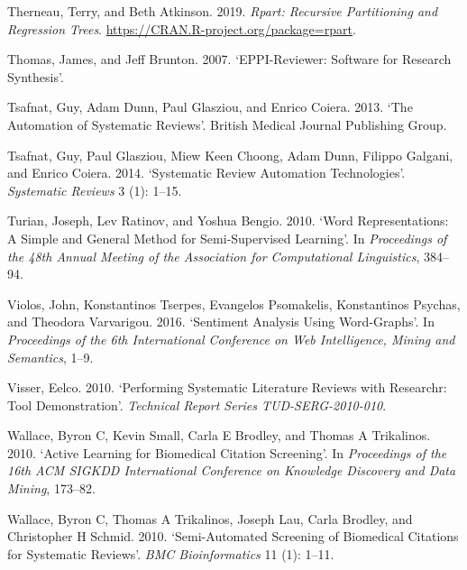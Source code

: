 \documentclass{article}
\newlength{\cslhangindent}
\newenvironment{CSLReferences}[2] %
 {%
  \setlength{\parindent}{0pt}
  \ifodd #1 \everypar{\setlength{\hangindent}{\cslhangindent}}\ignorespaces\fi
  \ifnum #2 > 0
  \setlength{\parskip}{#2\baselineskip}
  \fi
 }%
 {}
\begin{document}
\begin{CSLReferences}{1}{0}
\leavevmode{}%
Therneau, Terry, and Beth Atkinson. 2019. \emph{Rpart: Recursive
Partitioning and Regression Trees}.
\url{https://CRAN.R-project.org/package=rpart}.

\leavevmode{}%
Thomas, James, and Jeff Brunton. 2007. {`EPPI-Reviewer: Software for
Research Synthesis'}.

\leavevmode{}%
Tsafnat, Guy, Adam Dunn, Paul Glasziou, and Enrico Coiera. 2013. {`The
Automation of Systematic Reviews'}. British Medical Journal Publishing
Group.

\leavevmode{}%
Tsafnat, Guy, Paul Glasziou, Miew Keen Choong, Adam Dunn, Filippo
Galgani, and Enrico Coiera. 2014. {`Systematic Review Automation
Technologies'}. \emph{Systematic Reviews} 3 (1): 1--15.

\leavevmode{}%
Turian, Joseph, Lev Ratinov, and Yoshua Bengio. 2010. {`Word
Representations: A Simple and General Method for Semi-Supervised
Learning'}. In \emph{Proceedings of the 48th Annual Meeting of the
Association for Computational Linguistics}, 384--94.

\leavevmode{}%
Violos, John, Konstantinos Tserpes, Evangelos Psomakelis, Konstantinos
Psychas, and Theodora Varvarigou. 2016. {`Sentiment Analysis Using
Word-Graphs'}. In \emph{Proceedings of the 6th International Conference
on Web Intelligence, Mining and Semantics}, 1--9.

\leavevmode{}%
Visser, Eelco. 2010. {`Performing Systematic Literature Reviews with
Researchr: Tool Demonstration'}. \emph{Technical Report Series
TUD-SERG-2010-010}.

\leavevmode{}%
Wallace, Byron C, Kevin Small, Carla E Brodley, and Thomas A Trikalinos.
2010. {`Active Learning for Biomedical Citation Screening'}. In
\emph{Proceedings of the 16th ACM SIGKDD International Conference on
Knowledge Discovery and Data Mining}, 173--82.

\leavevmode{}%
Wallace, Byron C, Thomas A Trikalinos, Joseph Lau, Carla Brodley, and
Christopher H Schmid. 2010. {`Semi-Automated Screening of Biomedical
Citations for Systematic Reviews'}. \emph{BMC Bioinformatics} 11 (1):
1--11.


\end{CSLReferences}
\end{document}
